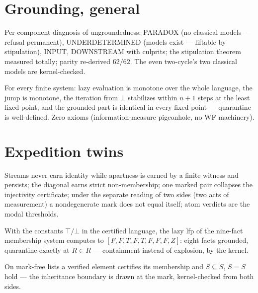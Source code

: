 \chapter{Grounding, general}

\begin{theorem}\label{thm:passport}
  \leanok
  Per-component diagnosis of ungroundedness: PARADOX (no classical
  models --- refusal permanent), UNDERDETERMINED (models exist ---
  liftable by stipulation), INPUT, DOWNSTREAM with culprits; the
  stipulation theorem measured totally; parity re-derived $62/62$.
  The even two-cycle's two classical models are kernel-checked.
\end{theorem}

\begin{theorem}\label{thm:kt}
  \leanok
  For every finite system: lazy evaluation is monotone over the whole
  language, the jump is monotone, the iteration from $\bot$ stabilizes
  within $n{+}1$ steps at the least fixed point, and the grounded part
  is identical in every fixed point --- quarantine is well-defined.
  Zero axioms (information-measure pigeonhole, no WF machinery).
\end{theorem}

\chapter{Expedition twins}

\begin{theorem}\label{thm:exped}
  \leanok
  Streams never earn identity while apartness is earned by a finite
  witness and persists; the diagonal earns strict non-membership; one
  marked pair collapses the injectivity certificate; under the separate
  reading of two sides (two acts of measurement) a nondegenerate mark does
  not equal itself; atom verdicts are the modal thresholds.
\end{theorem}

\begin{theorem}\label{thm:russellkt}
  \leanok
  With the constants $\top/\bot$ in the certified language, the lazy
  lfp of the nine-fact membership system computes to
  $[F,F,T,F,T,F,F,F,Z]$: eight facts grounded, quarantine exactly at
  $R\in R$ --- containment instead of explosion, by the kernel.
\end{theorem}

\begin{theorem}\label{thm:cleansets}
  \leanok
  On mark-free lists a verified element certifies its membership and
  $S \subseteq S$, $S = S$ hold --- the inheritance boundary is drawn
  at the mark, kernel-checked from both sides.
\end{theorem}
